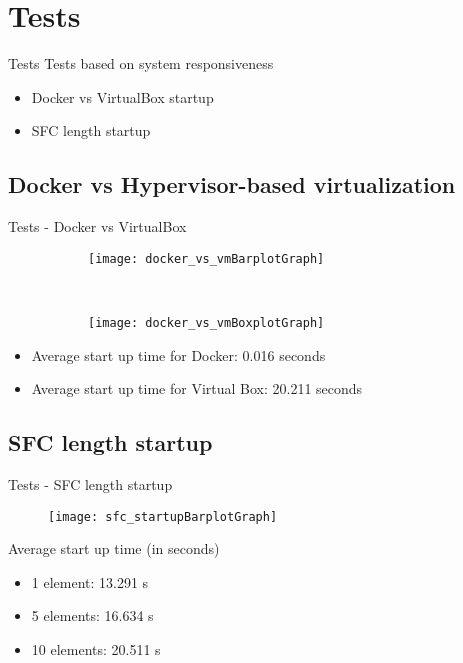\section{Tests}
\begin{frame}{Tests}
  Tests based on system responsiveness
  \begin{itemize}
    \item<1-> Docker vs VirtualBox startup
    \item<2-> SFC length startup 
  \end{itemize}
\end{frame}

\subsection{Docker vs Hypervisor-based virtualization}
\begin{frame}{Tests - Docker vs VirtualBox}

  \begin{figure}
    \centering
    \begin{subfigure}[b]{0.45\textwidth}
      \texttt{[image: docker\_vs\_vmBarplotGraph]}
    \end{subfigure}
    ~
    \begin{subfigure}[b]{0.45\textwidth}
      \texttt{[image: docker\_vs\_vmBoxplotGraph]}
    \end{subfigure}
  \end{figure}
  \begin{itemize}
  \item Average start up time for Docker: 0.016 seconds
  \item Average start up time for Virtual Box: 20.211 seconds
  \end{itemize}
\end{frame}

\subsection{SFC length startup}
\begin{frame}{Tests - SFC length startup}
  \begin{figure}
    \centering
    \texttt{[image: sfc\_startupBarplotGraph]}
  \end{figure}

  Average start up time (in seconds)
  \begin{multicols}{2}
    \begin{itemize}
    \item 1 element: 13.291 s
    \item 5 elements: 16.634 s
    \item 10 elements: 20.511 s
    \end{itemize}
  \end{multicols}

  \vfill
\end{frame}
